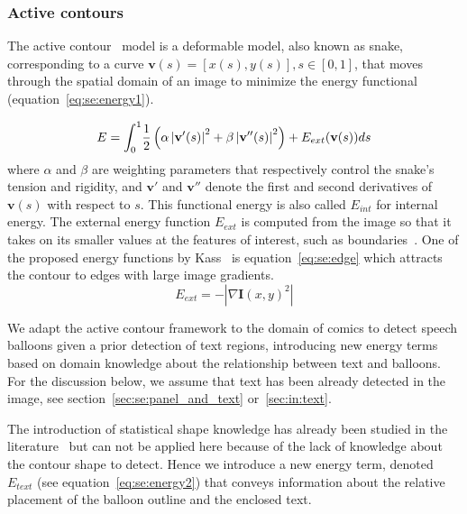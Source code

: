 \subsubsection{Active contours}
\label{sec:se:active_contour}

The active contour~\cite{Kass1988} model is a deformable model, also known as snake, corresponding to a curve $\mathbf{v}(s)=[x(s),y(s)], s \in [0,1]$, that moves through the spatial domain of an image to minimize the energy functional (equation~\ref{eq:se:energy1}).

\begin{equation}\label{eq:se:energy1}
  E = \int_0^1 \! \frac{1}{2} \left( \alpha \left|\mathbf{v}'(s) \right|^2 + \beta \left| \mathbf{v}''(s) \right|^2 \right) + E_{ext}(\mathbf{v}(s))ds\\
\end{equation}
where $\alpha$ and $\beta$ are weighting parameters that respectively control the snake's tension and rigidity, and $\mathbf{v}'$ and $\mathbf{v}''$ denote the first and second derivatives of $\mathbf{v}(s)$ with respect to $s$. This functional energy is also called $E_{int}$ for internal energy.
The external energy function $E_{ext}$ is computed from the image so that it takes on its smaller values at the features of interest, such as boundaries~\cite{Xu1998}.
One of the proposed energy functions by Kass~\cite{Kass1988} is equation~\ref{eq:se:edge} which attracts the contour to edges with large image gradients. 
\begin{equation}\label{eq:se:edge}
  E_{ext} = -|\nabla \mathbf{I}(x,y)^2|
\end{equation}

We adapt the active contour framework to the domain of comics to detect speech balloons given a prior detection of text regions, introducing new energy terms based on domain knowledge about the relationship between text and balloons.
For the discussion below, we assume that text has been already detected in the image, see section~\ref{sec:se:panel_and_text} or~\ref{sec:in:text}.%

The introduction of statistical shape knowledge has already been studied in the literature~\cite{Cremers2002} but can not be applied here because of the lack of knowledge about the contour shape to detect.
Hence we introduce a new energy term, denoted $E_{text}$ (see equation~\ref{eq:se:energy2}) that conveys information about the relative placement of the balloon outline and the enclosed text.

